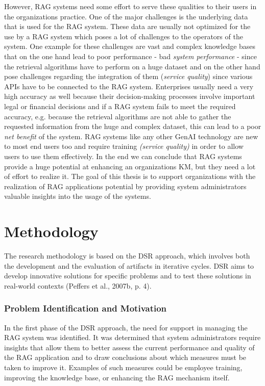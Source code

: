 \documentclass[
	english,
	ruledheaders=section,%
	class=report,%
	thesis={type=bachelor},%
	accentcolor=1b,%
	custommargins=true,%
	marginpar=false,%
	parskip=half-,%
	fontsize=11pt,%
	DIV=14,
]{tudapub}
\begin{document}
However, RAG systems need some effort to serve these qualities to their users in the organizations practice. One of the major challenges is the underlying data that is used for the RAG system. These data are usually not optimized for the use by a RAG system which poses a lot of challenges to the operators of the system. One example for these challenges are vast and complex knowledge bases that on the one hand lead to poor performance - bad \textit{system performance} - since the retrieval algorithms have to perform on a huge dataset and on the other hand pose challenges regarding the integration of them (\textit{service quality}) since various APIs have to be connected to the RAG system. Enterprises usually need a very high accuracy as well because their decision-making processes involve important legal or financial decisions and if a RAG system fails to meet the required accuracy, e.g. because the retrieval algorithms are not able to gather the requested information from the huge and complex dataset, this can lead to a poor \textit{net benefit} of the system. RAG systems like any other GenAI technology are new to most end users too and require training \textit{(service quality)} in order to allow users to use them effectively. In the end we can conclude that RAG systems provide a huge potential at enhancing an organizations KM, but they need a lot of effort to realize it. The goal of this thesis is to support organizations with the realization of RAG applications potential by providing system administrators valuable insights into the usage of the systems.\\
\chapter{Methodology}
The research methodology is based on the DSR approach, which involves both the development and the evaluation of artifacts in iterative cycles. DSR aims to develop innovative solutions for specific problems and to test these solutions in real-world contexts (Peffers et al., 2007b, p. 4).\\
\subsection{Problem Identification and Motivation}
In the first phase of the DSR approach, the need for support in managing the RAG system was identified. It was determined that system administrators require insights that allow them to better assess the current performance and quality of the RAG application and to draw conclusions about which measures must be taken to improve it. Examples of such measures could be employee training, improving the knowledge base, or enhancing the RAG mechanism itself.
\end{document}
